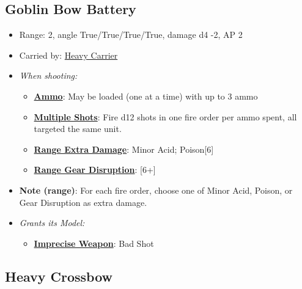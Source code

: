 \documentclass[a4paper,12pt]{article}
\begin{document}
\subsection{Goblin Bow Battery}
\label{equipment-goblin-bow-battery}

\begin{itemize}
\item Range: 2, angle True/True/True/True, damage d4 -2, AP 2
\item Carried by: \hyperref[model-heavy-carrier]{Heavy Carrier}
\item \textit{When shooting:}
\begin{itemize}
\item \textbf{\hyperref[rule-special-ammo]{Ammo}}: May be loaded (one at a time) with up to 3 ammo
\item \textbf{\hyperref[rule-special-multiple-shots]{Multiple Shots}}: Fire d12 shots in one fire order per ammo spent, all targeted the same unit.
\item \textbf{\hyperref[rule-special-range-extra-damage]{Range Extra Damage}}: Minor Acid; Poison[6]
\item \textbf{\hyperref[rule-special-range-gear-disruption]{Range Gear Disruption}}: [6+]

\end{itemize}

\item \textbf{Note (range)}: For each fire order, choose one of Minor Acid, Poison, or Gear Disruption as extra damage.




\item \textit{Grants its Model:}
\begin{itemize}
\item \textbf{\hyperref[rule-special-to-hit]{Imprecise Weapon}}: Bad Shot

\end{itemize}

\end{itemize}

\subsection{Heavy Crossbow}
\label{equipment-heavy-crossbow}
\end{document}
